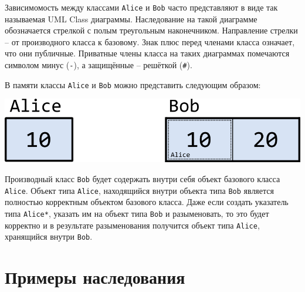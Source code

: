 \documentclass{article}
\begin{document}
Зависимомость между классами \texttt{Alice} и \texttt{Bob} часто представляют в виде так называемая UML Class диаграммы. Наследование на такой диаграмме обозначается стрелкой с полым треугольным наконечником. Направление стрелки -- от производного класса к базовому. Знак плюс перед членами класса означает, что они публичные. Приватные члены класса на таких диаграммах помечаются символом минус (\texttt{-}), а защищённые -- решёткой (\texttt{\#}).

В памяти классы \texttt{Alice} и \texttt{Bob} можно представить следующим образом:
\begin{center}
\includegraphics[scale=1]{../images/alice_bob_in_memory.png}
\end{center}
Производный класс \texttt{Bob} будет содержать внутри себя объект базового класса \texttt{Alice}. Объект типа \texttt{Alice}, находящийся внутри объекта типа \texttt{Bob} является полностью корректным объектом базового класса. Даже если создать указатель типа \texttt{Alice*}, указать им на объект типа \texttt{Bob} и разыменовать, то это будет корректно и в результате разыменования получится объект типа \texttt{Alice}, хранящийся внутри \texttt{Bob}.


\section{Примеры наследования}
\end{document}
